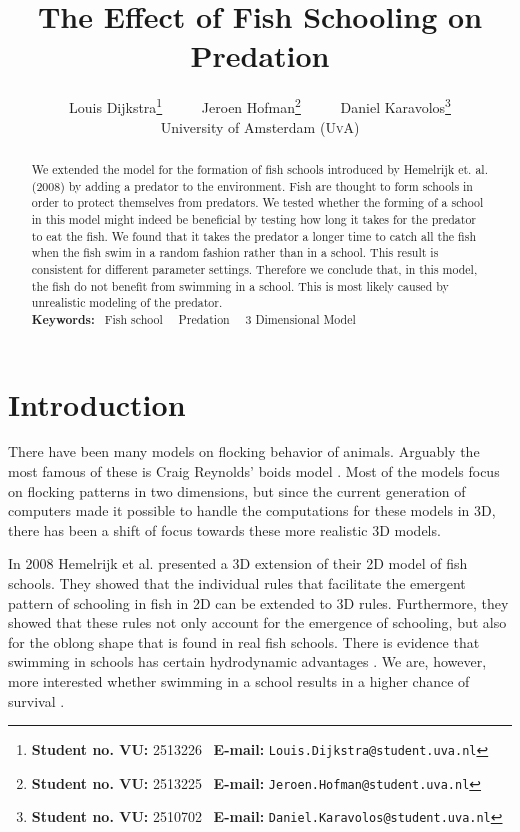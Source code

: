\documentclass[11pt,a4paper]{article}
\author{Louis Dijkstra\footnote{\textbf{Student no. VU:} 2513226 \textbar\ \textbf{E-mail:} \texttt{Louis.Dijkstra@student.uva.nl}} \ \ \ \ \ Jeroen Hofman\footnote{\textbf{Student no. VU:} 2513225 \textbar\ \textbf{E-mail:} \texttt{Jeroen.Hofman@student.uva.nl}} \ \ \ \ \ Daniel Karavolos\footnote{\textbf{Student no. VU:} 2510702 \textbar\ \textbf{E-mail:} \texttt{Daniel.Karavolos@student.uva.nl}}  \\[15pt] University of Amsterdam (\textsc{UvA})}
\title{The Effect of Fish Schooling on Predation\\
		}
\begin{document}
\captionsetup{width=0.8\textwidth}
\maketitle

\begin{abstract}
\noindent\small{ We extended the model for the formation of fish schools introduced by Hemelrijk et. al. (2008) by adding a predator to the environment. Fish are thought to form schools in order to protect themselves from predators. We tested whether the forming of a school in this model might indeed be beneficial by testing how long it takes for the predator to eat the fish. We found that it takes the predator a longer time to catch all the fish when the fish swim in a random fashion rather than in a school. This result is consistent for different parameter settings. Therefore we conclude that, in this model, the fish do not benefit from swimming in a school. This is most likely caused by unrealistic modeling of the predator.  \\[10pt]
\noindent \textbf{Keywords:} \textbullet\ Fish school \ \textbullet\ Predation \ \textbullet\ 3 Dimensional Model }
\end{abstract}

\newpage
\tableofcontents
\newpage

\section{Introduction}
\label{sec:intro}
There have been many models on flocking behavior of animals. Arguably the most famous of these is Craig Reynolds' boids model \cite{reynolds}. Most of the models focus on flocking patterns in two dimensions, but since the current generation of computers made it possible to handle the computations for these models in 3D, there has been a shift of focus towards these more realistic 3D models.

In 2008 Hemelrijk et al. \cite{hemelrijk} presented a 3D extension of their 2D model of fish schools. They showed that the individual rules %
that facilitate the emergent pattern of schooling in fish in 2D can be extended to 3D rules. Furthermore, they showed that these rules not only account for the emergence of schooling, but also for the oblong shape that is found in real fish schools. 
There is evidence that swimming in schools has certain hydrodynamic advantages \cite{svendsen}. We are, however, more interested whether swimming in a school results in a higher chance of survival \cite{cullen}. 
\end{document}
